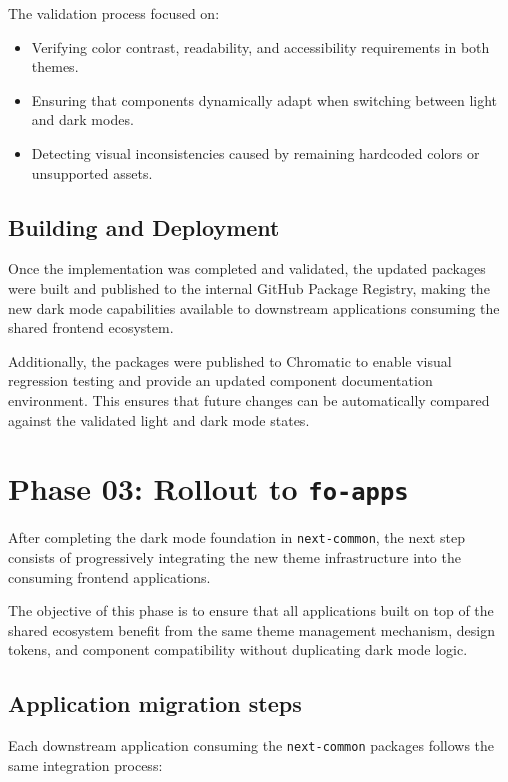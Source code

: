 The validation process focused on:

\begin{itemize}
    \item Verifying color contrast, readability, and accessibility requirements in both themes.
    \item Ensuring that components dynamically adapt when switching between light and dark modes.
    \item Detecting visual inconsistencies caused by remaining hardcoded colors or unsupported assets.
\end{itemize}

\subsection{Building and Deployment}

Once the implementation was completed and validated, the updated packages were built and published to the internal GitHub Package Registry, making the new dark mode capabilities available to downstream applications consuming the shared frontend ecosystem.

Additionally, the packages were published to Chromatic to enable visual regression testing and provide an updated component documentation environment. This ensures that future changes can be automatically compared against the validated light and dark mode states.

\section{Phase 03: Rollout to \texttt{fo-apps}}

After completing the dark mode foundation in \texttt{next-common}, the next step consists of progressively integrating the new theme infrastructure into the consuming frontend applications.

The objective of this phase is to ensure that all applications built on top of the shared ecosystem benefit from the same theme management mechanism, design tokens, and component compatibility without duplicating dark mode logic.

\subsection{Application migration steps}

Each downstream application consuming the \texttt{next-common} packages follows the same integration process:

